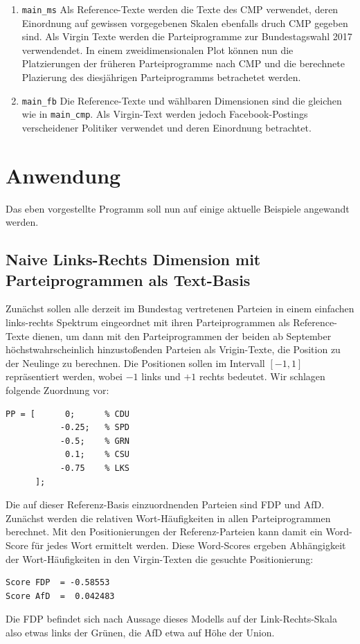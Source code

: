 \begin{enumerate}[(a)]
\begin{enumerate}
\item \verb|main_ms| \newline
Als Reference-Texte werden die Texte des CMP verwendet, deren Einordnung auf gewissen vorgegebenen Skalen ebenfalls druch CMP gegeben sind. Als Virgin Texte werden die Parteiprogramme zur Bundestagswahl 2017 verwendendet. In einem zweidimensionalen Plot können nun die Platzierungen der früheren Parteiprogramme nach CMP und die berechnete Plazierung des diesjährigen Parteiprogramms betrachetet werden.

\item \verb|main_fb| \newline
Die Reference-Texte und wählbaren Dimensionen sind die gleichen wie in \verb|main_cmp|. Als Virgin-Text werden jedoch Facebook-Postings verscheidener Politiker verwendet und deren Einordnung betrachtet. 

\end{enumerate}

   
\end{enumerate}


\section{Anwendung}
Das eben vorgestellte Programm soll nun auf einige aktuelle Beispiele angewandt werden.
    \subsection{Naive Links-Rechts Dimension mit Parteiprogrammen als Text-Basis}
    Zunächst sollen alle derzeit im Bundestag vertretenen Parteien in einem einfachen links-rechts Spektrum eingeordnet mit ihren Parteiprogrammen als Reference-Texte dienen, um dann mit den Parteiprogrammen der beiden ab September höchstwahrscheinlich hinzustoßenden Parteien als Vrigin-Texte, die Position zu der Neulinge zu berechnen. Die Positionen sollen im Intervall $[-1,1]$ repräsentiert werden, wobei $-1$ links und $+1$ rechts bedeutet. Wir schlagen folgende Zuordnung vor:
    \begin{lstlisting}[style=Matlab-editor]
PP = [      0;      % CDU
           -0.25;   % SPD
           -0.5;    % GRN
            0.1;    % CSU
           -0.75    % LKS
      ];    
    \end{lstlisting}
      
     Die auf dieser Referenz-Basis einzuordnenden Parteien sind FDP und AfD. 
     Zunächst werden die relativen Wort-Häufigkeiten in allen Parteiprogrammen berechnet. 
     Mit den Positionierungen der Referenz-Parteien kann damit ein Word-Score für jedes Wort ermittelt werden.
     Diese Word-Scores ergeben Abhängigkeit der Wort-Häufigkeiten in den Virgin-Texten die gesuchte Positionierung:
    \begin{lstlisting}[style=Matlab-editor]
Score FDP  = -0.58553 
Score AfD  =  0.042483
    \end{lstlisting}
    Die FDP befindet sich nach Aussage dieses Modells auf der Link-Rechts-Skala also etwas links der Grünen, die AfD etwa auf Höhe der Union.
    
